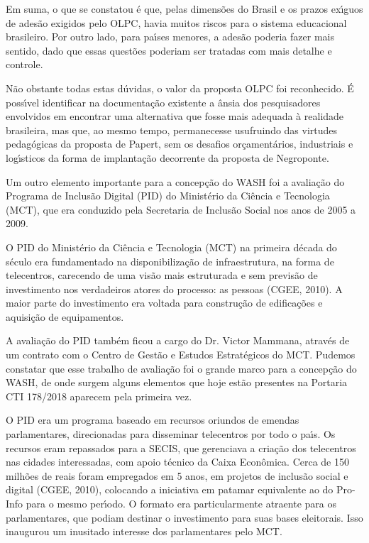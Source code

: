 \documentclass[
12pt,		%
openright,	%
twoside,  %
a4paper,			%
chapter=TITLE,		%
english,			%
french,				%
spanish,			%
brazil				%
]{USPSC-classe/USPSC}
\begin{document}
Em suma, o que se constatou \'e que, pelas dimens\~oes do Brasil e os prazos ex\'{\i}guos de ades\~ao exigidos pelo OLPC, havia muitos riscos para o sistema educacional brasileiro. Por outro lado, para pa\'{\i}ses menores, a ades\~ao poderia fazer mais sentido, dado que essas quest\~oes poderiam ser tratadas com mais detalhe e controle.




N\~ao obstante todas estas d\'uvidas, o valor da proposta OLPC foi reconhecido. \'E poss\'{\i}vel identificar na documenta\c{c}\~ao existente a \^ansia dos pesquisadores envolvidos em encontrar uma alternativa que fosse mais adequada \`a realidade brasileira, mas que, ao mesmo tempo, permanecesse usufruindo das virtudes pedag\'ogicas da proposta de Papert, sem os desafios or\c{c}ament\'arios, industriais e log\'{\i}sticos da forma de implanta\c{c}\~ao decorrente da proposta de Negroponte.




Um outro elemento importante para a concep\c{c}\~ao do WASH foi a avalia\c{c}\~ao do Programa de Inclus\~ao Digital (PID) do Minist\'erio da Ci\^encia e Tecnologia (MCT), que era conduzido pela Secretaria de Inclus\~ao Social nos anos de 2005 a 2009.




O PID do Minist\'erio da Ci\^encia e Tecnologia (MCT) na primeira d\'ecada do s\'eculo era fundamentado na disponibiliza\c{c}\~ao de infraestrutura, na forma de telecentros, carecendo de uma vis\~ao mais estruturada e sem previs\~ao de investimento nos verdadeiros atores do processo: as pessoas (CGEE, 2010). A maior parte do investimento era voltada para constru\c{c}\~ao de edifica\c{c}\~oes e aquisi\c{c}\~ao de equipamentos.




A avalia\c{c}\~ao do PID tamb\'em ficou a cargo do Dr. Victor Mammana, atrav\'es de um contrato com o Centro de Gest\~ao e Estudos Estrat\'egicos do MCT. Pudemos constatar que esse trabalho de avalia\c{c}\~ao foi o grande marco para a concep\c{c}\~ao do WASH, de onde surgem alguns elementos que hoje est\~ao presentes na Portaria CTI 178/2018 aparecem pela primeira vez.




O PID era um programa baseado em recursos oriundos de emendas parlamentares, direcionadas para disseminar telecentros por todo o pa\'{\i}s. Os recursos eram repassados para a SECIS, que gerenciava a cria\c{c}\~ao dos telecentros nas cidades interessadas, com apoio t\'ecnico da Caixa Econ\^omica. Cerca de 150 milh\~oes de reais foram empregados em 5 anos, em projetos de inclus\~ao social e digital (CGEE, 2010), colocando a iniciativa em patamar equivalente ao do Pro-Info para o mesmo per\'{\i}odo. O formato era particularmente atraente para os parlamentares, que podiam destinar o investimento para suas bases eleitorais. Isso inaugurou um inusitado interesse dos parlamentares pelo MCT.
\end{document}
